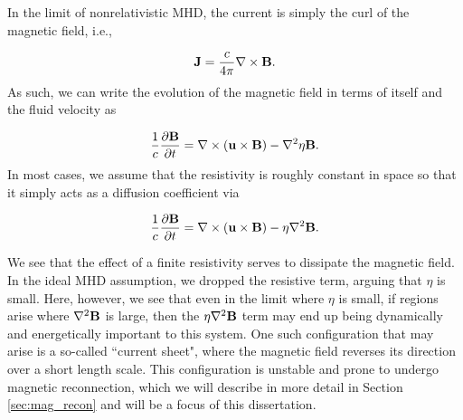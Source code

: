 In the limit of nonrelativistic MHD, the current is simply the curl of the magnetic field, i.e.,

\begin{equation}
	\bold{J} = \frac{c}{4\pi}\nabla \times \bold{B}.
\end{equation}
As such, we can write the evolution of the magnetic field in terms of itself and the fluid velocity as 

\begin{equation}
	\frac{1}{c}\frac{\partial \bold{B}}{\partial t} =\nabla \times (\bold{u}\times\bold{B}) -\nabla^2 \eta \bold{B}.
\end{equation}
In most cases, we assume that the resistivity is roughly constant in space so that it simply acts as a diffusion coefficient via

\begin{equation}
		\frac{1}{c}\frac{\partial \bold{B}}{\partial t} =\nabla \times (\bold{u}\times\bold{B}) -\eta \nabla^2 \bold{B}.
\end{equation}

We see that the effect of a finite resistivity serves to dissipate the magnetic field.  In the ideal MHD assumption, we dropped the resistive term, arguing that $\eta$ is small.  Here, however, we see that even in the limit where $\eta$ is small, if regions arise where $\nabla^2 \bold{B}$ is large, then the $\eta \nabla^2 \bold{B}$ term may end up being dynamically and energetically important to this system.  One such configuration that may arise is a so-called ``current sheet", where the magnetic field reverses its direction over a short length scale.  This configuration is unstable and prone to undergo magnetic reconnection, which we will describe in more detail in Section \ref{sec:mag_recon} and will be a focus of this dissertation.

